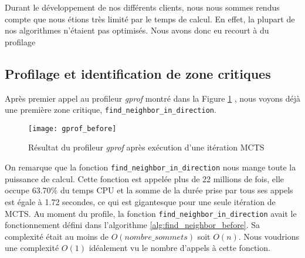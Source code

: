 Durant le développement de nos différents clients, nous nous sommes rendus
compte que nous étions très limité par le temps de calcul. En effet,
la plupart de nos algorithmes n'étaient pas optimisés. Nous avons donc
eu recourt à du profilage

\subsection{Profilage et identification de zone critiques}
Après premier appel au profileur \textit{gprof} montré dans la Figure \ref{fig:gprof-find-neighbors}
, nous voyons déjà une première zone critique, \verb|find_neighbor_in_direction|.

\begin{figure}[H]
	\texttt{[image: gprof\_before]}
	\caption{Résultat du profileur \textit{gprof} après exécution d'une itération MCTS}
	\label{fig:gprof-find-neighbors}
\end{figure}

On remarque que la fonction \verb|find_neighbor_in_direction| nous mange
toute la puissance de calcul. Cette fonction est appelée plus de 22 millions de fois, elle 
occupe 63.70\% du temps CPU et la somme de la durée prise par tous ses appels est égale à 1.72 secondes, ce qui est gigantesque
pour une seule itération de MCTS. Au moment du profile, la fonction \verb|find_neighbor_in_direction| avait le fonctionnement défini
dans l'algorithme \ref{alg:find_neighbor_before}. Sa complexité était au moins de $O(nombre\_sommets)$ soit $O(n)$. Nous voudrions une complexité
$O(1)$ idéalement vu le nombre d'appels à cette fonction.

\begin{algorithm}
	\label{alg:find_neighbor_before}
\end{algorithm}